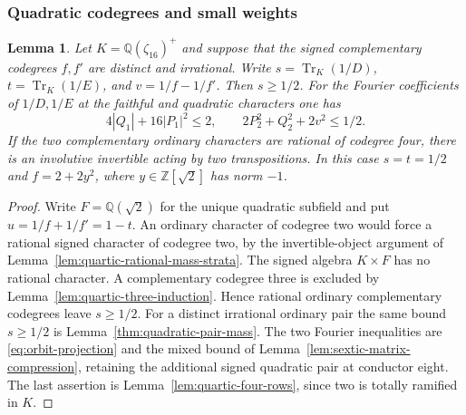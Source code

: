 \documentclass[11pt,reqno]{amsart}
\newtheorem{lemma}[theorem]{Lemma}
\theoremstyle{remark}\newtheorem{remark}[theorem]{Remark}
\numberwithin{equation}{section}
\begin{document}
\subsubsection{Quadratic codegrees and small weights}
\begin{lemma}\label{thm:cyclic16-irrational-finite}
Let $K=\mathbb Q(\zeta_{16})^+$ and suppose that the signed
complementary codegrees $f,f'$ are distinct and irrational. Write
$s=\operatorname{Tr}_K(1/D)$, $t=\operatorname{Tr}_K(1/E)$,
and $v=1/f-1/f'$. Then $s\ge1/2$. For the Fourier coefficients
of $1/D,1/E$ at the faithful and quadratic characters one has
\[
    4|Q_1|+16|P_1|^2\le2,\qquad 2P_2^2+Q_2^2+2v^2\le1/2 .
\]
If the two complementary ordinary characters are rational of codegree
four, there is an involutive invertible acting by two transpositions.
In this case $s=t=1/2$ and $f=2+2y^2$, where
$y\in\mathbb Z[\sqrt2]$ has norm $-1$.
\end{lemma}
\begin{proof}
Write $F=\mathbb Q(\sqrt2)$ for the unique quadratic subfield and put $u=1/f+1/f'=1-t$.
An ordinary character of codegree two would force a rational signed
character of codegree two, by the invertible-object argument of
Lemma~\ref{lem:quartic-rational-mass-strata}. The signed algebra
$K\times F$ has no rational character. A complementary codegree three
is excluded by Lemma~\ref{lem:quartic-three-induction}. Hence rational
ordinary complementary codegrees leave $s\ge1/2$.
For a distinct irrational ordinary pair the same bound $s\ge1/2$
is Lemma~\ref{thm:quadratic-pair-mass}. The two Fourier inequalities
are \eqref{eq:orbit-projection} and the mixed bound of
Lemma~\ref{lem:sextic-matrix-compression}, retaining the additional
signed quadratic pair at conductor eight.
The last assertion is Lemma~\ref{lem:quartic-four-rows}, since two
is totally ramified in $K$.
\end{proof}
\end{document}
